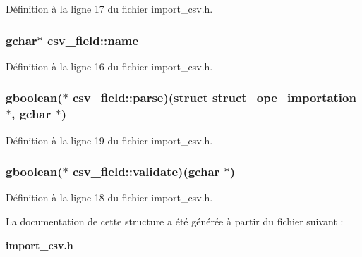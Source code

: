 Définition à la ligne 17 du fichier import\_\-csv.h.

\subsubsection[{name}]{\setlength{\rightskip}{0pt plus 5cm}gchar$\ast$ {\bf csv\_\-field::name}}\label{structcsv__field_a8c5818bb3ba4ae26bb1a98beb9d7d010}


Définition à la ligne 16 du fichier import\_\-csv.h.

\subsubsection[{parse}]{\setlength{\rightskip}{0pt plus 5cm}gboolean($\ast$  {\bf csv\_\-field::parse})(struct {\bf struct\_\-ope\_\-importation} $\ast$, gchar $\ast$)}\label{structcsv__field_aafe8e297882a823c790a95759bae3700}


Définition à la ligne 19 du fichier import\_\-csv.h.

\subsubsection[{validate}]{\setlength{\rightskip}{0pt plus 5cm}gboolean($\ast$  {\bf csv\_\-field::validate})(gchar $\ast$)}\label{structcsv__field_ae9174945eb44c8330a51acc2c56da1f7}


Définition à la ligne 18 du fichier import\_\-csv.h.



La documentation de cette structure a été générée à partir du fichier suivant :\begin{DoxyCompactItemize}
\item 
{\bf import\_\-csv.h}\end{DoxyCompactItemize}
